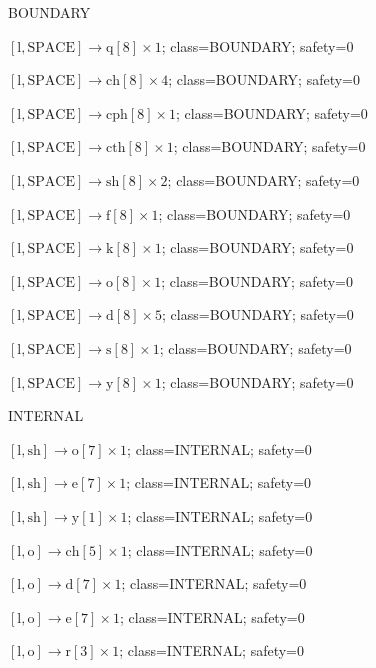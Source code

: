 BOUNDARY\par
\(\left[\mathrm{l}, \mathrm{SPACE}\right] \to \mathrm{q}[8] \times 1\); class=BOUNDARY; safety=0\par
\(\left[\mathrm{l}, \mathrm{SPACE}\right] \to \mathrm{ch}[8] \times 4\); class=BOUNDARY; safety=0\par
\(\left[\mathrm{l}, \mathrm{SPACE}\right] \to \mathrm{cph}[8] \times 1\); class=BOUNDARY; safety=0\par
\(\left[\mathrm{l}, \mathrm{SPACE}\right] \to \mathrm{cth}[8] \times 1\); class=BOUNDARY; safety=0\par
\(\left[\mathrm{l}, \mathrm{SPACE}\right] \to \mathrm{sh}[8] \times 2\); class=BOUNDARY; safety=0\par
\(\left[\mathrm{l}, \mathrm{SPACE}\right] \to \mathrm{f}[8] \times 1\); class=BOUNDARY; safety=0\par
\(\left[\mathrm{l}, \mathrm{SPACE}\right] \to \mathrm{k}[8] \times 1\); class=BOUNDARY; safety=0\par
\(\left[\mathrm{l}, \mathrm{SPACE}\right] \to \mathrm{o}[8] \times 1\); class=BOUNDARY; safety=0\par
\(\left[\mathrm{l}, \mathrm{SPACE}\right] \to \mathrm{d}[8] \times 5\); class=BOUNDARY; safety=0\par
\(\left[\mathrm{l}, \mathrm{SPACE}\right] \to \mathrm{s}[8] \times 1\); class=BOUNDARY; safety=0\par
\(\left[\mathrm{l}, \mathrm{SPACE}\right] \to \mathrm{y}[8] \times 1\); class=BOUNDARY; safety=0\par
INTERNAL\par
\(\left[\mathrm{l}, \mathrm{sh}\right] \to \mathrm{o}[7] \times 1\); class=INTERNAL; safety=0\par
\(\left[\mathrm{l}, \mathrm{sh}\right] \to \mathrm{e}[7] \times 1\); class=INTERNAL; safety=0\par
\(\left[\mathrm{l}, \mathrm{sh}\right] \to \mathrm{y}[1] \times 1\); class=INTERNAL; safety=0\par
\(\left[\mathrm{l}, \mathrm{o}\right] \to \mathrm{ch}[5] \times 1\); class=INTERNAL; safety=0\par
\(\left[\mathrm{l}, \mathrm{o}\right] \to \mathrm{d}[7] \times 1\); class=INTERNAL; safety=0\par
\(\left[\mathrm{l}, \mathrm{o}\right] \to \mathrm{e}[7] \times 1\); class=INTERNAL; safety=0\par
\(\left[\mathrm{l}, \mathrm{o}\right] \to \mathrm{r}[3] \times 1\); class=INTERNAL; safety=0\par
